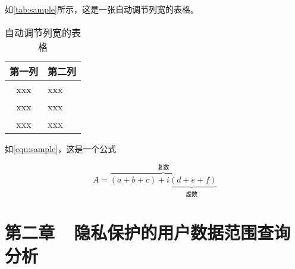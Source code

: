 \par 如\autoref{tab:sample}所示，这是一张自动调节列宽的表格。

\begin{table}[htbp]
    \caption{\label{tab:sample}自动调节列宽的表格}
    \begin{tabularx}{\linewidth}{c|X<{\centering}}
        \hline
        第一列 & 第二列 \\ \hline
        xxx & xxx \\ \hline
        xxx & xxx \\ \hline
        xxx & xxx \\ \hline
    \end{tabularx}
\end{table}


\par 如\autoref{equ:sample}，这是一个公式

\begin{equation}
    \label{equ:sample}
    A=\overbrace{(a+b+c)+\underbrace{i(d+e+f)}_{\text{虚数}}}^{\text{复数}}
\end{equation}




\chapter*{第二章~~隐私保护的用户数据范围查询分析}

